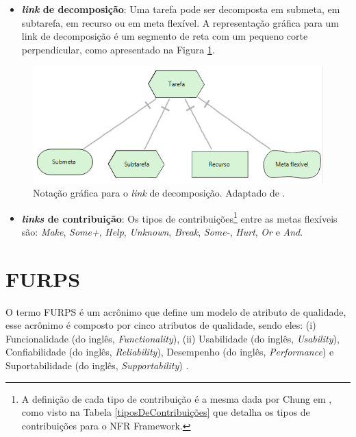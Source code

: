 \begin{itemize}	
	\item \textbf{\textit{link} de decomposição}: Uma tarefa pode ser decomposta em submeta, em subtarefa, em recurso ou em meta flexível. A representação gráfica para um link de decomposição é um segmento de reta com um pequeno corte perpendicular, como apresentado na Figura \ref{decomposicaoLink}.    
\end{itemize}	

\begin{figure}[h!]
		\centering
		\includegraphics[keepaspectratio=true,scale=1.0]{figuras/decomposicaoLink.PNG}
		\caption{Notação gráfica para o \textit{link} de decomposição. Adaptado de \cite{istarwiki20}.}
		\label{decomposicaoLink}
\end{figure}

\begin{itemize}		
	\item \textbf{\textit{links} de contribuição}: Os tipos de contribuições\footnote[1]{A definição de cada tipo de contribuição é a mesma dada por Chung em \cite{chung2012non}, como visto na Tabela \ref{tiposDeContribuições} que detalha os tipos de contribuições para o NFR Framework.} entre as metas flexíveis são: \textit{Make}, \textit{Some+}, \textit{Help}, \textit{Unknown}, \textit{Break}, \textit{Some-}, \textit{Hurt}, \textit{Or} e \textit{And}. 
\end{itemize}


\section{FURPS}
\label{sec:furps}

O termo FURPS é um acrônimo que define um modelo de atributo de qualidade, esse acrônimo é composto por cinco atributos de qualidade, sendo eles: (i) Funcionalidade (do inglês, \textit{Functionality}), (ii) Usabilidade (do inglês, \textit{Usability}), Confiabilidade (do inglês, \textit{Reliability}), Desempenho (do inglês, \textit{Performance}) e Suportabilidade (do inglês, \textit{Supportability}) \cite{umar2011analyzing}.

